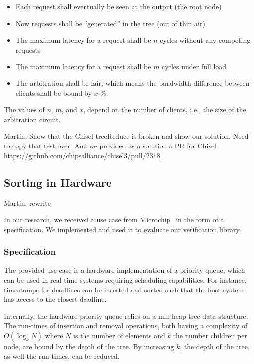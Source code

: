 \documentclass[conference]{IEEEtran}
\newcommand{\martin}[1]{{\color{blue} Martin: #1}}
\begin{document}
\begin{itemize}
\item Each request shall eventually be seen at the output (the root node)
\item Now requests shall be ``generated'' in the tree (out of thin air)
\item The maximum latency for a request shall be $n$ cycles without any competing requests
\item The maximum latency for a request shall be $m$ cycles under full load
\item The arbitration shall be fair, which means the bandwidth difference between clients shall be bound by $x$ \%.
\end{itemize}

The values of $n$, $m$, and $x$, depend on the number of clients, i.e., the size of the arbitration
circuit.

\martin{Show that the Chisel treeReduce is broken and show our solution. Need to copy that test
over. And we provided as a solution a PR for Chisel \url{https://github.com/chipsalliance/chisel3/pull/2318}}



\subsection{Sorting in Hardware}

\martin{rewrite}


In our research, we received a use case from Microchip~\cite{microchip} in the form of a specification.
We implemented and used it to evaluate our verification library.

\subsubsection{Specification}

The provided use case is a hardware implementation of a priority queue, which can be used in real-time systems requiring scheduling capabilities. 
For instance, timestamps for deadlines can be inserted and sorted such that the host system has access to the closest deadline.

Internally, the hardware priority queue relies on a min-heap tree data structure. 
The run-times of insertion and removal operations, both having a complexity of $O(\log_k N)$ where $N$ is the number of elements and $k$ the number children per node, are bound by the depth of the tree. 
By increasing $k$, the depth of the tree, as well the run-times, can be reduced.
\end{document}
